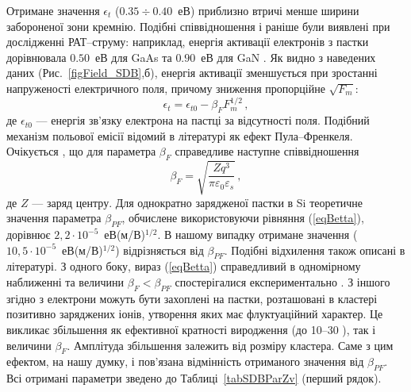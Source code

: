 Отримане значення $\epsilon_t$ ($0.35\div0.40$~еВ) приблизно втричі менше ширини забороненої зони кремнію.
Подібні співвідношення і раніше були виявлені при дослідженні РАТ--струму:
наприклад, енергія активації електронів з пастки дорівнювала $0.50$~еВ для GaAs \cite{Pipinys1999} та $0.90$~еВ для GaN \cite{Pipinys2006}.
Як видно з наведених даних (Рис.~\ref{figField_SDB},б),
енергія активації зменшується при зростанні напруженості електричного поля,
причому зниження пропорційне $\sqrt{F_m}$:
\begin{equation}\label{eqEtE}
    \epsilon_t=\epsilon_{t0}-\beta_F F_m^{1/2}\,,
\end{equation}
де
$\epsilon_{t0}$ --- енергія зв'язку електрона на пастці за відсутності поля.
Подібний механізм польової емісії відомий в літературі як ефект Пула--Френкеля.
Очікується \cite{PF:Mitrofanov,PF:ZhdanovaR}, що для параметра $\beta_F$ справедливе наступне співвідношення
\begin{equation}\label{eqBetta}
    \beta_F=\sqrt{\frac{Zq^3}{\pi\varepsilon_0\varepsilon_s}}\,,
\end{equation}
де
$Z$ --- заряд центру.
Для однократно зарядженої пастки в Si теоретичне значення параметра $\beta_{PF}$, обчислене використовуючи
рівняння (\ref{eqBetta}), дорівнює $2,2\cdot10^{-5}$~еВ(м/В)$^{1/2}$.
В нашому випадку отримане значення ($10,5\cdot10^{-5}$~еВ(м/В)$^{1/2}$) відрізняється від $\beta_{PF}$.
Подібні відхилення також описані в літературі.
З одного боку, вираз (\ref{eqBetta}) справедливий в одномірному наближенні та величини  $\beta_F<\beta_{PF}$ спостерігалися експериментально \cite{PF:Mitrofanov,PF:ZhdanovaR}.
З іншого згідно з \cite{PF:ZhdanovaR} електрони можуть бути захоплені на пастки, розташовані в кластері позитивно заряджених іонів, утворення яких має флуктуаційний характер.
Це викликає збільшення як ефективної кратності виродження (до 10--30 \cite{PF:ZhdanovaR}), так і величини $\beta_F$.
Амплітуда збільшення залежить від розміру кластера.
Саме з цим ефектом, на нашу думку, і пов'язана відмінність отриманого значення від $\beta_{PF}$.
Всі отримані параметри зведено до Таблиці~\ref{tabSDBParZv} (перший рядок).




